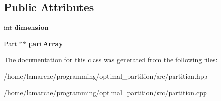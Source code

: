 \subsection*{Public Attributes}
\begin{DoxyCompactItemize}
\item 
\hypertarget{classHyperPart_a6563c05d359489690b7d98a886bbd856}{int {\bfseries dimension}}\label{classHyperPart_a6563c05d359489690b7d98a886bbd856}

\item 
\hypertarget{classHyperPart_a6aae7e066a66fdb1ef427ce763bc0ce3}{\hyperlink{classPart}{Part} $\ast$$\ast$ {\bfseries part\-Array}}\label{classHyperPart_a6aae7e066a66fdb1ef427ce763bc0ce3}

\end{DoxyCompactItemize}


The documentation for this class was generated from the following files\-:\begin{DoxyCompactItemize}
\item 
/home/lamarche/programming/optimal\-\_\-partition/src/partition.\-hpp\item 
/home/lamarche/programming/optimal\-\_\-partition/src/partition.\-cpp\end{DoxyCompactItemize}
